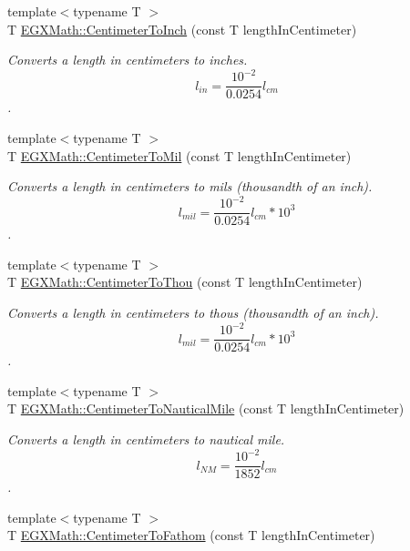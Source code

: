 \begin{DoxyCompactItemize}
{\footnotesize template$<$typename T $>$ }\\T \mbox{\hyperlink{group___e_g_x_math-_conversions-_length_conversions-_s_i-_centimeter-_imperial_ga9d90fd3e24ac92c43f57db3e27a24507}{E\+G\+X\+Math\+::\+Centimeter\+To\+Inch}} (const T length\+In\+Centimeter)
\begin{DoxyCompactList}\small\item\em Converts a length in centimeters to inches. \[ l_{in}= \frac{10^{-2}}{0.0254} l_{cm} \]. \end{DoxyCompactList}\item 
{\footnotesize template$<$typename T $>$ }\\T \mbox{\hyperlink{group___e_g_x_math-_conversions-_length_conversions-_s_i-_centimeter-_imperial_ga4d32adb63d2c5ac44ce1f7a0ba746452}{E\+G\+X\+Math\+::\+Centimeter\+To\+Mil}} (const T length\+In\+Centimeter)
\begin{DoxyCompactList}\small\item\em Converts a length in centimeters to mils (thousandth of an inch). \[ l_{mil}= \frac{10^{-2}}{0.0254} l_{cm} * 10^{3} \]. \end{DoxyCompactList}\item 
{\footnotesize template$<$typename T $>$ }\\T \mbox{\hyperlink{group___e_g_x_math-_conversions-_length_conversions-_s_i-_centimeter-_imperial_ga06aee91cfbc90db20c6a085129dbf4fa}{E\+G\+X\+Math\+::\+Centimeter\+To\+Thou}} (const T length\+In\+Centimeter)
\begin{DoxyCompactList}\small\item\em Converts a length in centimeters to thous (thousandth of an inch). \[ l_{mil}= \frac{10^{-2}}{0.0254} l_{cm} * 10^{3} \]. \end{DoxyCompactList}\item 
{\footnotesize template$<$typename T $>$ }\\T \mbox{\hyperlink{group___e_g_x_math-_conversions-_length_conversions-_s_i-_centimeter-_nautical_ga65cf4453e28b375ee5c52389620939c6}{E\+G\+X\+Math\+::\+Centimeter\+To\+Nautical\+Mile}} (const T length\+In\+Centimeter)
\begin{DoxyCompactList}\small\item\em Converts a length in centimeters to nautical mile. \[ l_{NM}= \frac{10^{-2}}{1852} l_{cm} \]. \end{DoxyCompactList}\item 
{\footnotesize template$<$typename T $>$ }\\T \mbox{\hyperlink{group___e_g_x_math-_conversions-_length_conversions-_s_i-_centimeter-_nautical_ga9a46ae39f9cc70947d27a297c1c3f113}{E\+G\+X\+Math\+::\+Centimeter\+To\+Fathom}} (const T length\+In\+Centimeter)

\end{DoxyCompactItemize}
